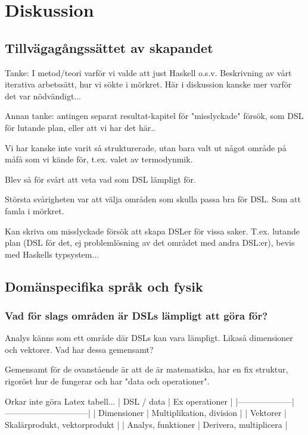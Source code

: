 
\chapter{Diskussion}

\begin{binge}
\section{Tillvägagångssättet av skapandet}

Tanke: I metod/teori varför vi valde att just Haskell o.s.v. Beskrivning av vårt iterativa arbetssätt, hur vi sökte i mörkret. Här i diskussion kanske mer varför det var nödvändigt...

Annan tanke: antingen separat resultat-kapitel för "misslyckade" försök, som DSL för lutande plan, eller att vi har det här..

Vi har kanske inte varit så strukturerade, utan bara valt ut något område på måfå som vi kände för, t.ex. valet av termodynmik.

Blev så för svårt att veta vad som DSL lämpligt för.

Största svårigheten var att välja områden som skulla passa bra för DSL. Som att
famla i mörkret.

Kan skriva om misslyckade försök att skapa DSLer för vissa saker. T.ex. lutande plan (DSL för det, ej problemlösning av det området med andra DSL:er), bevis med Haskells typsystem...

\section{Domänspecifika språk och fysik}

\subsection{Vad för slags områden är DSLs lämpligt att göra för?}

Analys känns som ett område där DSLs kan vara lämpligt. Likaså dimensioner och
vektorer. Vad har dessa gemensamt?

Gemensamt för de ovanstående är att de är matematiska, har en fix struktur,
rigoröst hur de fungerar och har "data och operationer".

Orkar inte göra Latex tabell...
| DSL / data         | Ex operationer               |
|--------------------|------------------------------|
| Dimensioner        | Multiplikation, division     |
| Vektorer           | Skalärprodukt, vektorprodukt |
| Analys, funktioner | Derivera, multiplicera       |


\end{binge}

